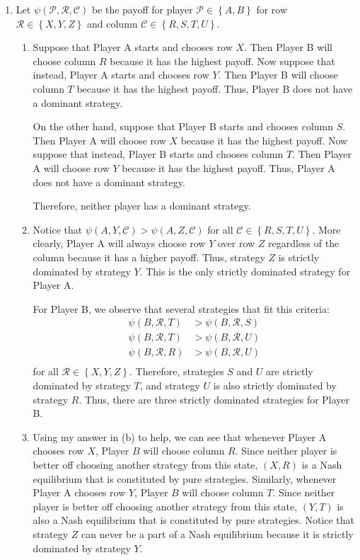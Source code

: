 \documentclass{article}
\newcommand{\pay}[3]{\psi\left(#1,#2,#3\right)}
\begin{document}
\begin{enumerate}
    \item Let $\pay{\mathcal{P}}{\mathcal{R}}{\mathcal{C}}$ be the payoff for player $\mathcal{P}\in\left\{A,B\right\}$ for row $\mathcal{R}\in\left\{X,Y,Z\right\}$ and column $\mathcal{C}\in\left\{R,S,T,U\right\}$.
    \begin{enumerate}
        \item Suppose that Player A starts and chooses row $X$. Then Player B will choose column $R$ because it has the highest payoff. Now suppose that instead, Player A starts and chooses row $Y$. Then Player B will choose column $T$ because it has the highest payoff. Thus, Player B does not have a dominant strategy. 
        
        On the other hand, suppose that Player B starts and chooses column $S$. Then Player A will choose row $X$ because it has the highest payoff. Now suppose that instead, Player B starts and chooses column $T$. Then Player A will choose row $Y$ because it has the highest payoff. Thus, Player A does not have a dominant strategy.
        
        Therefore, neither player has a dominant strategy.

        \item Notice that $\pay{A}{Y}{\mathcal{C}}>\pay{A}{Z}{\mathcal{C}}$ for all $\mathcal{C}\in\left\{R,S,T,U\right\}$. More clearly, Player A will always choose row $Y$ over row $Z$ regardless of the column because it has a higher payoff. Thus, strategy $Z$ is strictly dominated by strategy $Y$. This is the only strictly dominated strategy for Player A.
        
        For Player B, we observe that several strategies that fit this criteria: 
        \begin{align*}
            \pay{B}{\mathcal{R}}{T} & >\pay{B}{\mathcal{R}}{S} \\
            \pay{B}{\mathcal{R}}{T} & >\pay{B}{\mathcal{R}}{U} \\
            \pay{B}{\mathcal{R}}{R} & >\pay{B}{\mathcal{R}}{U} \\
        \end{align*}
        for all $\mathcal{R}\in\left\{X,Y,Z\right\}$. Therefore, strategies $S$ and $U$ are strictly dominated by strategy $T$, and strategy $U$ is also strictly dominated by strategy $R$. Thus, there are three strictly dominated strategies for Player B.

        \item Using my answer in (b) to help, we can see that whenever Player A chooses row $X$, Player $B$ will choose column $R$. Since neither player is better off choosing another strategy from this state, $(X,R)$ is a Nash equilibrium that is constituted by pure strategies. Similarly, whenever Player A chooses row $Y$, Player $B$ will choose column $T$. Since neither player is better off choosing another strategy from this state, $(Y,T)$ is also a Nash equilibrium that is constituted by pure strategies. Notice that strategy $Z$ can never be a part of a Nash equilibrium because it is strictly dominated by strategy $Y$.
    \end{enumerate}
\end{enumerate}
\end{document}
